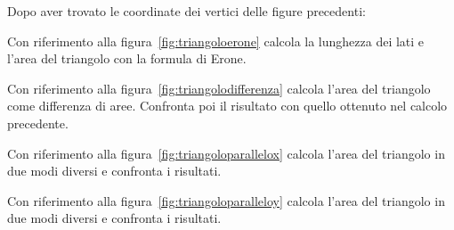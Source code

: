 \begin{exrig}
 Dopo aver trovato le coordinate dei vertici delle figure precedenti:

 \begin{esempio}
 \label{ex:D.18}
  Con riferimento alla figura~\ref{fig:triangoloerone} calcola 
  la lunghezza dei lati e l'area del triangolo con la formula di Erone.
 \end{esempio}

 \begin{esempio}
  Con riferimento alla figura~\ref{fig:triangolodifferenza} calcola 
  l'area del triangolo come differenza di aree.
  Confronta poi il risultato con quello ottenuto nel calcolo precedente.
 \end{esempio}

 \begin{esempio}
  Con riferimento alla figura~\ref{fig:triangoloparallelox} calcola 
  l'area del triangolo in due modi diversi e confronta i risultati.
 \end{esempio}

 \begin{esempio}
  Con riferimento alla figura~\ref{fig:triangoloparalleloy} calcola 
  l'area del triangolo in due modi diversi e confronta i risultati.
 \end{esempio}
\end{exrig}

% 

